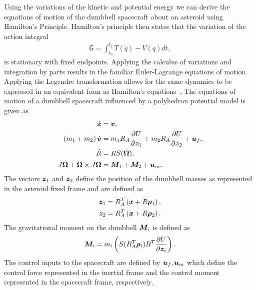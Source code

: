 \documentclass[letterpaper, paper,11pt]{AAS}		%
\begin{document}
Using the variations of the kinetic and potential energy we can derive the equations of motion of the dumbbell spacecraft about an asteroid using Hamilton's Principle. 
Hamilton's principle then states that the variation of the action integral
\begin{align}
    \mathsf{G} = \int_{t_0}^{t_f} T(\dot{q}) - V(q) dt,
\end{align}
is stationary with fixed endpoints. 
Applying the calculus of variations and integration by parts results in the familiar Euler-Lagrange equations of motion.
Applying the Legendre transformation allows for the same dynamics to be expressed in an equivalent form as Hamilton's equations~\cite{lanczos1970}.
The equations of motion of a dumbbell spacecraft influenced by a polyhedron potential model is given as
\begin{align}
    \dot{\bm{x}} &= \bm{v}, \label{eq:position_kinematics}\\
    \left( m_1 + m_2 \right) \dot{\bm{v}} &= m_1 R_A \frac{\partial U}{\partial \bm{z}_1} + m_2 R_A \frac{\partial U}{\partial \bm{z}_2} + \bm{u}_f, \label{eq:translational_dynamics}\\
    \dot{R} &= R S(\bm{\Omega}) , \label{eq:attitude_kinematics}\\
    J \dot{\bm{\Omega}} + \bm{\Omega} \times J \bm{\Omega} &= \bm{M}_1 + \bm{M}_2 + \bm{u}_m. \label{eq:attitude_dynamics}
\end{align}
The vectors \( \bm{z}_1 \) and \( \bm{z}_2\) define the position of the dumbbell masses as represented in the asteroid fixed frame and are defined as
\begin{align}
    \bm{z}_1 &= R_A^T \left( \bm{x} + R \bm{\rho}_1 \right) , \\
    \bm{z}_2 &= R_A^T \left( \bm{x} + R \bm{\rho}_2 \right).
\end{align}
The gravitational moment on the dumbbell \( \bm{M}_i\) is defined as
\begin{align}
    \bm{M}_i = m_i \left( S(R_A^T \bm{\rho}_i) R^T \frac{\partial U}{\partial \bm{z}_i} \right).
\end{align}
The control inputs to the spacecraft are defined by \( \bm{u}_f, \bm{u}_m \) which define the control force represented in the inertial frame and the control moment represented in the spacecraft frame, respectively. 
 
\end{document}

